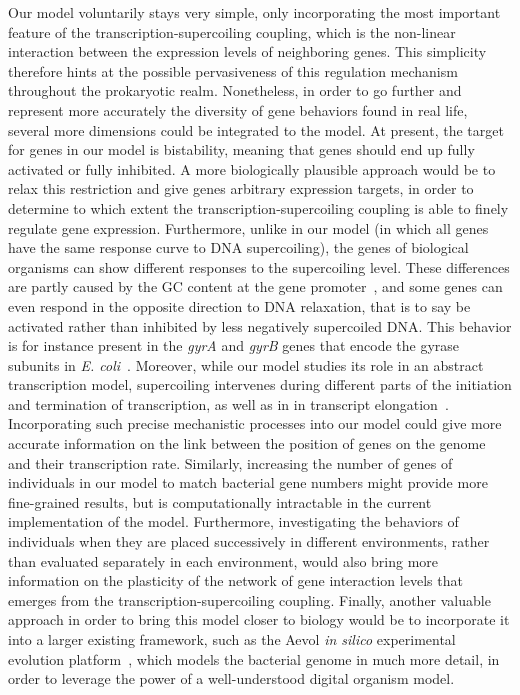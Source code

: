 Our model voluntarily stays very simple, only incorporating the most important feature of the transcription-supercoiling coupling, which is the non-linear interaction between the expression levels of neighboring genes.
This simplicity therefore hints at the possible pervasiveness of this regulation mechanism throughout the prokaryotic realm.
Nonetheless, in order to go further and represent more accurately the diversity of gene behaviors found in real life, several more dimensions could be integrated to the model.
At present, the target for genes in our model is bistability, meaning that genes should end up fully activated or fully inhibited.
A more biologically plausible approach would be to relax this restriction and give genes arbitrary expression targets, in order to determine to which extent the transcription-supercoiling coupling is able to finely regulate gene expression.
Furthermore, unlike in our model (in which all genes have the same response curve to DNA supercoiling), the genes of biological organisms can show different responses to the supercoiling level.
These differences are partly caused by the GC content at the gene promoter~\citep{forquet2021}, and some genes can even respond in the opposite direction to DNA relaxation, that is to say be activated rather than inhibited by less negatively supercoiled DNA.
This behavior is for instance present in the \emph{gyrA} and \emph{gyrB} genes that encode the gyrase subunits in \emph{E. coli}~\citep{peter2004}.
Moreover, while our model studies its role in an abstract transcription model, supercoiling intervenes during different parts of the initiation and termination of transcription, as well as in in transcript elongation~\citep{martisb.2019}.
Incorporating such precise mechanistic processes into our model could give more accurate information on the link between the position of genes on the genome and their transcription rate.
Similarly, increasing the number of genes of individuals in our model to match bacterial gene numbers might provide more fine-grained results, but is computationally intractable in the current implementation of the model.
Furthermore, investigating the behaviors of individuals when they are placed successively in different environments, rather than evaluated separately in each environment, would also bring more information on the plasticity of the network of gene interaction levels that emerges from the transcription-supercoiling coupling.
Finally, another valuable approach in order to bring this model closer to biology would be to incorporate it into a larger existing framework, such as the Aevol \emph{in silico} experimental evolution platform~\citep{rutten2019}, which models the bacterial genome in much more detail, in order to leverage the power of a well-understood digital organism model.
